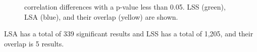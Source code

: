 \documentclass[10pt,letterpaper]{article}
\newlength\savedwidth
\newcommand\thickhline{\noalign{\global\savedwidth\arrayrulewidth\global\arrayrulewidth 2pt}%
\hline
\noalign{\global\arrayrulewidth\savedwidth}}
\begin{document}
\begin{figure}[H]
  \centering
  
  \caption{
    correlation differences with a p-value less than 0.05.
    LSS (green), LSA (blue), and their overlap (yellow) are shown.
  }
  \label{fig:restswitchvrepeat}
\end{figure}
LSA has a total of 339 significant results and LSS has a total of 1,205,
and their overlap is 5 results.
\end{document}
